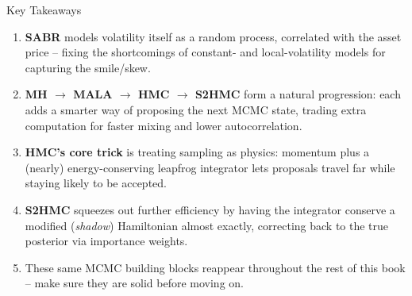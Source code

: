 \documentclass[aspectratio=169,10pt]{beamer}
\begin{document}
\begin{frame}{Key Takeaways}
  \begin{enumerate}
    \item \textbf{SABR} models volatility itself as a random process,
      correlated with the asset price -- fixing the shortcomings of constant-
      and local-volatility models for capturing the smile/skew.
    \item \textbf{MH $\to$ MALA $\to$ HMC $\to$ S2HMC} form a natural
      progression: each adds a smarter way of proposing the next MCMC state,
      trading extra computation for faster mixing and lower autocorrelation.
    \item \textbf{HMC's core trick} is treating sampling as physics: momentum
      plus a (nearly) energy-conserving leapfrog integrator lets proposals
      travel far while staying likely to be accepted.
    \item \textbf{S2HMC} squeezes out further efficiency by having the
      integrator conserve a modified (\emph{shadow}) Hamiltonian almost
      exactly, correcting back to the true posterior via importance weights.
    \item These same MCMC building blocks reappear throughout the rest of
      this book -- make sure they are solid before moving on.
  \end{enumerate}
\end{frame}
\end{document}

